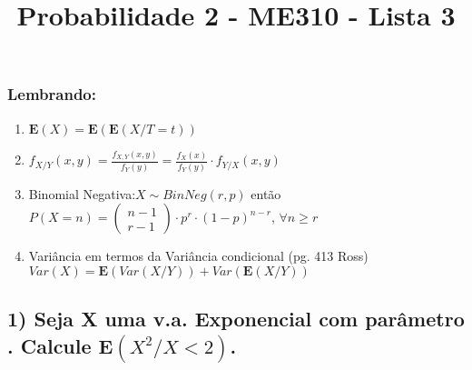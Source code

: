 \documentclass[portuguese]{article}
\DeclareRobustCommand{\greektext}{%
  \fontencoding{LGR}\selectfont\def\encodingdefault{LGR}}
\DeclareRobustCommand{\textgreek}[1]{\leavevmode{\greektext #1}}
\begin{document}
\title{Probabilidade 2 - ME310 - Lista 3}

\maketitle

\subsubsection*{Lembrando:}
\begin{enumerate}
\item $\mathbf{E}(X)=\mathbf{E}(\mathbf{E}(X/T=t))$
\item $f_{X/Y}(x,y)=\frac{f_{X,Y}(x,y)}{f_{Y}(y)}=\frac{f_{X}(x)}{f_{Y}(y)}\cdot f_{Y/X}(x,y)$
\item Binomial Negativa:$X\sim BinNeg(r,p)$ então $P(X=n)=\left(\begin{array}{c}
n-1\\
r-1
\end{array}\right)\cdot p^{r}\cdot(1-p)^{n-r}$, $\forall n\ge r$
\item Variância em termos da Variância condicional (pg. 413 Ross) $Var(X)=\mathbf{E}(Var(X/Y))+Var(\mathbf{E}(X/Y))$
\end{enumerate}
\pagebreak{}


\subsection*{\textmd{1) Seja X uma v.a. Exponencial com parâmetro \textgreek{l}.
Calcule $\mathbf{E}(X^{2}/X<2)$.}}
\end{document}
